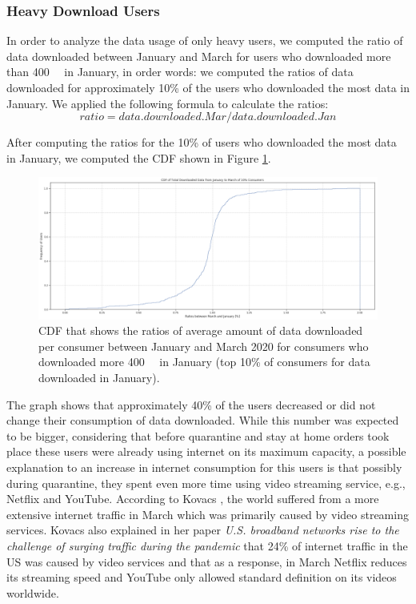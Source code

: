 \documentclass[conference,10pt]{IEEEtran}
\begin{document}
\subsubsection{Heavy Download Users}
\label{sec:heavy-download-users}

In order to analyze the data usage of only heavy users, we computed the ratio of data downloaded between January and March for users who downloaded more than \SI{400}{\giga\byte} in January, in order words: we computed the ratios of data downloaded for approximately 10\% of the users who downloaded the most data in January. We applied the following formula to calculate the ratios:
\begin{equation}
ratio= data.downloaded.Mar/ data.downloaded.Jan
\end{equation}

After computing the ratios for the 10\% of users who downloaded the most data in January, we computed the CDF shown in Figure \ref{fig:heavydown}.

\begin{figure}
\centering
\includegraphics[width=1.0\linewidth]{figs/heavydown.PNG}
\caption{CDF that shows the ratios of average amount of data downloaded per consumer between January and March 2020 for consumers who downloaded more \SI{400}{\giga\byte} in January (top 10\% of consumers for data downloaded in January).}
\label{fig:heavydown}
\end{figure}

The graph shows that approximately 40\% of the users decreased or did not change their consumption of data downloaded. While this number was expected to be bigger, considering that before quarantine and stay at home orders took place these users were already using internet on its maximum capacity, a possible explanation to an increase in internet consumption for this users is that possibly during quarantine, they spent even more time using video streaming service, e.g., Netflix and YouTube. According to Kovacs \cite{kovacs}, the world suffered from a more extensive internet traffic in March which was primarily caused by video streaming services. Kovacs also explained in her paper \textit{U.S. broadband networks rise to the challenge of surging traffic during the pandemic} that 24\% of internet traffic in the US was caused by video services and that as a response, in March Netflix reduces its streaming speed and YouTube only allowed standard definition on its videos worldwide.
\end{document}
